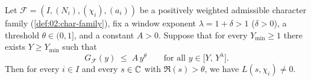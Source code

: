\begin{theorem}
\label{thm:02:window-landau}
Let $\mathcal{F} = (I, (N_i), (\chi_i), (a_i))$ be a positively weighted admissible character family (\cref{def:02:char-family}), fix a window exponent $\lambda = 1 + \delta > 1$ ($\delta > 0$), a threshold $\theta \in (0, 1]$, and a constant $A > 0$. Suppose that for every $Y_{\min} \ge 1$ there exists $Y \ge Y_{\min}$ such that
\begin{equation}
\label{eq:02:wl-hyp}
  G_{\mathcal{F}}(y) \;\le\; A\, y^\theta \qquad \text{for all } y \in \bigl[Y,\, Y^{\lambda}\bigr].
\end{equation}
Then for every $i \in I$ and every $s \in \mathbb{C}$ with $\Re(s) > \theta$, we have $L(s, \chi_i) \neq 0$.
\end{theorem}

